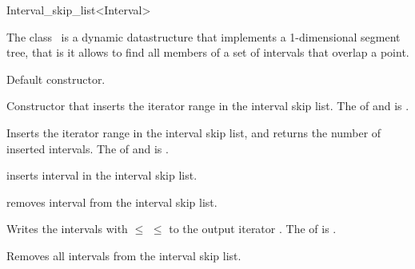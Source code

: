 \begin{ccRefClass} {Interval_skip_list<Interval>}

\ccDefinition

The class \ccClassTemplateName\ is a dynamic datastructure that implements a
1-dimensional segment tree, that is it allows to find all members of a set of 
intervals that overlap a point. 


\ccTypes
{}
\ccThreeToTwo





\ccCreation
{}

{Default constructor.}


{Constructor that inserts the iterator range \ccc{[first, last)} in the interval skip list. 
\ccPrecond The  of  and
 is .}

\ccOperations

{Inserts the iterator range \ccc{[first, last)} in the interval skip list, and returns
the number of inserted intervals.
\ccPrecond The  of  and
 is .}



{inserts interval  in the interval skip list.}

{removes interval  from the interval skip list.}


{Writes the intervals  with  $\leq$  $\leq$  to the
output iterator .
\ccPrecond The  of  is .}


{Removes all intervals from the interval skip list.}




\end{ccRefClass}
